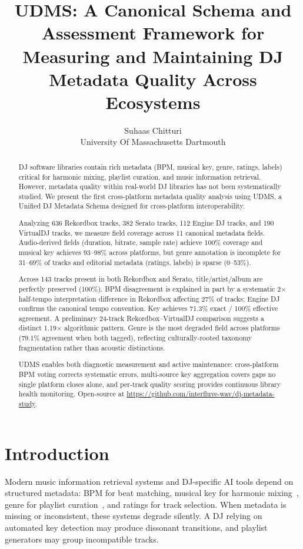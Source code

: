 \documentclass[letterpaper,10pt]{article}
\title{UDMS: A Canonical Schema and Assessment Framework for Measuring and Maintaining DJ Metadata Quality Across Ecosystems}
\author{Suhaas Chitturi\\University Of Massachusetts Dartmouth}
\let\citep\cite  %
\begin{document}
\maketitle

\begin{abstract}
DJ software libraries contain rich metadata (BPM, musical key, genre, ratings, labels) critical for harmonic mixing, playlist curation, and music information retrieval. However, metadata quality within real-world DJ libraries has not been systematically studied. We present the first cross-platform metadata quality analysis using UDMS, a Unified DJ Metadata Schema designed for cross-platform interoperability.

Analyzing 636 Rekordbox tracks, 382 Serato tracks, 112 Engine DJ tracks, and 190 VirtualDJ tracks, we measure field coverage across 11 canonical metadata fields. Audio-derived fields (duration, bitrate, sample rate) achieve 100\% coverage and musical key achieves 93--98\% across platforms, but genre annotation is incomplete for 31--69\% of tracks and editorial metadata (ratings, labels) is sparse (0--53\%).

Across 143 tracks present in both Rekordbox and Serato, title/artist/album are perfectly preserved (100\%). BPM disagreement is explained in part by a systematic 2$\times$ half-tempo interpretation difference in Rekordbox affecting 27\% of tracks; Engine DJ confirms the canonical tempo convention. Key achieves 71.3\% exact / 100\% effective agreement. A preliminary 24-track Rekordbox--VirtualDJ comparison suggests a distinct 1.19$\times$ algorithmic pattern. Genre is the most degraded field across platforms (79.1\% agreement when both tagged), reflecting culturally-rooted taxonomy fragmentation rather than acoustic distinctions.

UDMS enables both diagnostic measurement and active maintenance: cross-platform BPM voting corrects systematic errors, multi-source key aggregation covers gaps no single platform closes alone, and per-track quality scoring provides continuous library health monitoring. Open-source at \url{https://github.com/interfluve-wav/dj-metadata-study}.
\end{abstract}

\section{Introduction}

Modern music information retrieval systems and DJ-specific AI tools depend on structured metadata: BPM for beat matching, musical key for harmonic mixing~\citep{bernardes2018harmonic}, genre for playlist curation~\citep{liebman2015djmc}, and ratings for track selection. When metadata is missing or inconsistent, these systems degrade silently. A DJ relying on automated key detection may produce dissonant transitions, and playlist generators may group incompatible tracks.
\end{document}
